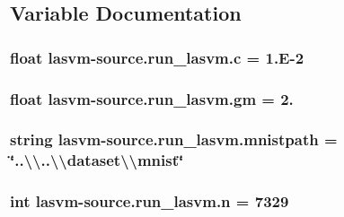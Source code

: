 \subsection{Variable Documentation}
\hypertarget{namespacelasvm-source_1_1run__lasvm_a106cbe64a3239a66754cf947632da25d}{
\subsubsection[{c}]{\setlength{\rightskip}{0pt plus 5cm}float lasvm-\/source.\+run\+\_\+lasvm.\+c = 1.\+E-\/2}}\label{namespacelasvm-source_1_1run__lasvm_a106cbe64a3239a66754cf947632da25d}
\hypertarget{namespacelasvm-source_1_1run__lasvm_a248bc008243cf2649d6f1ad75af8ba1b}{
\subsubsection[{gm}]{\setlength{\rightskip}{0pt plus 5cm}float lasvm-\/source.\+run\+\_\+lasvm.\+gm = 2.}}\label{namespacelasvm-source_1_1run__lasvm_a248bc008243cf2649d6f1ad75af8ba1b}
\hypertarget{namespacelasvm-source_1_1run__lasvm_ad38844cb34f54e26a42547412e461e8a}{
\subsubsection[{mnistpath}]{\setlength{\rightskip}{0pt plus 5cm}string lasvm-\/source.\+run\+\_\+lasvm.\+mnistpath = \char`\"{}..\textbackslash{}\textbackslash{}..\textbackslash{}\textbackslash{}dataset\textbackslash{}\textbackslash{}mnist\char`\"{}}}\label{namespacelasvm-source_1_1run__lasvm_ad38844cb34f54e26a42547412e461e8a}
\hypertarget{namespacelasvm-source_1_1run__lasvm_a858eb588c72a3613e58b0cd92fdc779e}{
\subsubsection[{n}]{\setlength{\rightskip}{0pt plus 5cm}int lasvm-\/source.\+run\+\_\+lasvm.\+n = 7329}}\label{namespacelasvm-source_1_1run__lasvm_a858eb588c72a3613e58b0cd92fdc779e}
